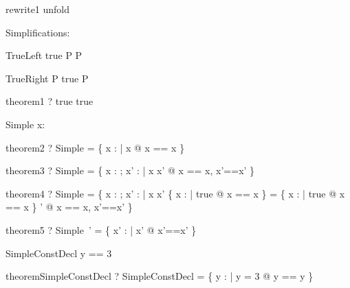 \begin{zsection}
\SECTION rewrite1 \parents unfold
\end{zsection}

Simplifications:

\begin{zedrule}{TrueLeft}
  true \land P \iff P
\end{zedrule}

\begin{zedrule}{TrueRight}
  P \land true \iff P
\end{zedrule}



\begin{theorem}{theorem1}
  \vdash? true \iff true
\end{theorem}




\begin{schema}{Simple}
  x: \nat
\end{schema}

\begin{theorem}{theorem2}
  \vdash? Simple =
    \{ x : \arithmos | x \in \nat @ \lblot x == x \rblot \}
\end{theorem}

\begin{theorem}{theorem3}
  \vdash? \Delta Simple =
    \{ x : \arithmos; x' : \arithmos | x \in \nat \land x' \in \nat @
    \lblot x == x, x'==x' \rblot \}
\end{theorem}

\begin{theorem}{theorem4}
  \vdash? \Xi Simple =
    \{ x : \arithmos; x' : \arithmos | x \in \nat \land x' \in \nat \land
       \theta \{ x : \arithmos | true @ \lblot x == x \rblot \} =
       \theta \{ x : \arithmos | true @ \lblot x == x \rblot \} ' @
    \lblot x == x, x'==x' \rblot \}
\end{theorem}

\begin{theorem}{theorem5}
  \vdash? Simple~' =
    \{ x' : \arithmos | x' \in \nat @
    \lblot x'==x' \rblot \}
\end{theorem}



\begin{schema}{SimpleConstDecl}
  y == 3
\end{schema}

\begin{theorem}{theoremSimpleConstDecl}
  \vdash? SimpleConstDecl =
    \{ y : \arithmos | y = 3 @ \lblot y == y \rblot \}
\end{theorem}

